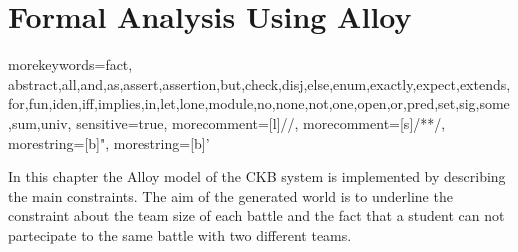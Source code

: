 \chapter{Formal Analysis Using Alloy}
{
    morekeywords={fact, abstract,all,and,as,assert,assertion,but,check,disj,else,enum,exactly,expect,extends,for,fun,iden,iff,implies,in,let,lone,module,no,none,not,one,open,or,pred,set,sig,some,sum,univ},
    sensitive=true,
    morecomment=[l]{//},
    morecomment=[s]{/*}{*/},
    morestring=[b]",
    morestring=[b]'
}

In this chapter the Alloy model of the CKB system is implemented by describing the main constraints. The aim of the generated world is to underline the constraint about the team size of each battle and the fact that a student can not partecipate to the same battle with two different teams.

